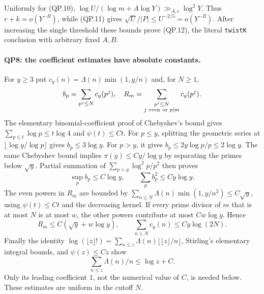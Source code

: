 Uniformly for (QP.10),
$\log U/(\log m+A\log Y)\gg_{A,\epsilon}\log^2Y$.
Thus $r+k=o(Y^{-B})$, while (QP.11) gives
$\sqrt U/|P|\le U^{-2/5}=o(Y^{-B})$.
After increasing the single threshold these bounds prove (QP.12),
the literal \texttt{twistK} conclusion with arbitrary fixed $A,B$.

\paragraph{QP8: the coefficient estimates have absolute constants.}
For $y\ge3$ put $c_y(n)=\Lambda(n)\min(1,y/n)$ and, for $N\ge1$,
\[
 b_p=\sum_{p^j\le N}c_y(p^j),\quad
 R_m=\sum_{\substack{p^j\le N\cr j\ {\rm even}\ {\rm or}\ p\mid m}}c_y(p^j).
\]
The elementary binomial-coefficient proof of Chebyshev's bound gives
$\sum_{p\le t}\log p\le t\log4$ and $\psi(t)\le Ct$.
For $p\le y$, splitting the geometric series at
$\lfloor\log y/\log p\rfloor$ gives $b_p\le3\log y$.
For $p>y$, it gives $b_p\le2y\log p/p\le2\log y$.
The same Chebyshev bound implies $\pi(y)\le Cy/\log y$ by separating
the primes below $\sqrt y$.  Partial summation of
$\sum_{p>y}\log^2p/p^2$ then proves
\[
 \sup_p b_p\le C\log y,\qquad \sum_p b_p^2\le Cy\log y.\tag{QP.13}
\]
The even powers in $R_m$ are bounded by
$\sum_{n\le N}\Lambda(n)\min(1,y/n^2)\le C\sqrt y$,
using $\psi(t)\le Ct$ and the decreasing kernel.
If every prime divisor of $m$ that is at most $N$ is at most $w$, the
other powers contribute at most $Cw\log y$.  Hence
\[
 R_m\le C(\sqrt y+w\log y),\qquad
 \sum_{n\le N}c_y(n)\le Cy\log(2N).                 \tag{QP.14}
\]
Finally the identity
$\log(\lfloor z\rfloor!)=\sum_{n\le z}\Lambda(n)\lfloor\lfloor z\rfloor/n\rfloor$,
Stirling's elementary integral bounds, and $\psi(z)\le Cz$ show
\[
                    \sum_{n\le z}\Lambda(n)/n\le\log z+C.\tag{QP.15}
\]
Only its leading coefficient $1$, not the numerical value of $C$, is
needed below.  These estimates are uniform in the cutoff $N$.

